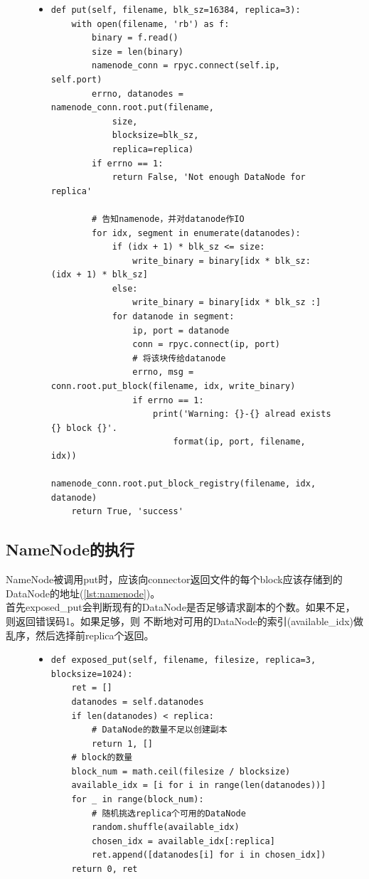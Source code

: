 \documentclass[a4paper]{article}
\begin{document}
\begin{figure}[!hbt]
\begin{itemize}
\item[] \begin{lstlisting}[style=mypython, label=lst:connector, caption=connector的具体代码]
def put(self, filename, blk_sz=16384, replica=3):
    with open(filename, 'rb') as f:
        binary = f.read()
        size = len(binary)
        namenode_conn = rpyc.connect(self.ip, self.port)
        errno, datanodes = namenode_conn.root.put(filename, 
            size, 
            blocksize=blk_sz, 
            replica=replica)
        if errno == 1:
            return False, 'Not enough DataNode for replica'

        # 告知namenode，并对datanode作IO
        for idx, segment in enumerate(datanodes):
            if (idx + 1) * blk_sz <= size:
                write_binary = binary[idx * blk_sz: (idx + 1) * blk_sz]
            else:
                write_binary = binary[idx * blk_sz :]
            for datanode in segment:
                ip, port = datanode
                conn = rpyc.connect(ip, port)
                # 将该块传给datanode
                errno, msg = conn.root.put_block(filename, idx, write_binary)
                if errno == 1:
                    print('Warning: {}-{} alread exists {} block {}'.
                        format(ip, port, filename, idx))
                namenode_conn.root.put_block_registry(filename, idx, datanode)
    return True, 'success'
\end{lstlisting}
\end{itemize}
\end{figure}

\subsection{NameNode的执行}
NameNode被调用put时，应该向connector返回文件的每个block应该存储到的DataNode的地址(\autoref{lst:namenode})。\\

首先exposed\_put会判断现有的DataNode是否足够请求副本的个数。如果不足，则返回错误码1。如果足够，则
不断地对可用的DataNode的索引(available\_idx)做乱序，然后选择前replica个返回。
\begin{figure}[!hbt]
\begin{itemize}
\item[] \begin{lstlisting}[style=mypython, label=lst:namenode, caption=NameNode的put函数实现]
def exposed_put(self, filename, filesize, replica=3, blocksize=1024):
    ret = []
    datanodes = self.datanodes
    if len(datanodes) < replica:
        # DataNode的数量不足以创建副本
        return 1, []
    # block的数量
    block_num = math.ceil(filesize / blocksize)
    available_idx = [i for i in range(len(datanodes))]
    for _ in range(block_num):
        # 随机挑选replica个可用的DataNode
        random.shuffle(available_idx)
        chosen_idx = available_idx[:replica]
        ret.append([datanodes[i] for i in chosen_idx])
    return 0, ret
\end{lstlisting}
\end{itemize}
\end{figure}
\end{document}
